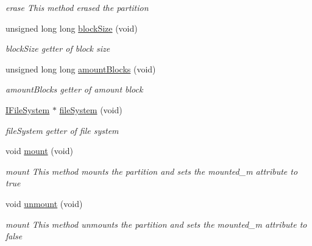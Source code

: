 \begin{DoxyCompactItemize}
\begin{DoxyCompactList}\small\item\em erase This method erased the partition \end{DoxyCompactList}\item 
unsigned long long \mbox{\hyperlink{classcore_1_1logic_1_1_partition_ad3fb03e884170c6068b6724f1121ecc6}{block\+Size}} (void)
\begin{DoxyCompactList}\small\item\em block\+Size getter of block size \end{DoxyCompactList}\item 
unsigned long long \mbox{\hyperlink{classcore_1_1logic_1_1_partition_a28f8b672dccb67a06036e223be813950}{amount\+Blocks}} (void)
\begin{DoxyCompactList}\small\item\em amount\+Blocks getter of amount block \end{DoxyCompactList}\item 
\mbox{\hyperlink{classcore_1_1_i_file_system}{I\+File\+System}} $\ast$ \mbox{\hyperlink{classcore_1_1logic_1_1_partition_a37dd86b3bc84bc1c7463beaf6d3adc57}{file\+System}} (void)
\begin{DoxyCompactList}\small\item\em file\+System getter of file system \end{DoxyCompactList}\item 
\mbox{\label{classcore_1_1logic_1_1_partition_adeee9ac61d563134c5c1157d5e8d80d5}} 
void \mbox{\hyperlink{classcore_1_1logic_1_1_partition_adeee9ac61d563134c5c1157d5e8d80d5}{mount}} (void)
\begin{DoxyCompactList}\small\item\em mount This method mounts the partition and sets the mounted\+\_\+m attribute to true \end{DoxyCompactList}\item 
\mbox{\label{classcore_1_1logic_1_1_partition_adc87e31edb60281d230acdf4bd972848}} 
void \mbox{\hyperlink{classcore_1_1logic_1_1_partition_adc87e31edb60281d230acdf4bd972848}{unmount}} (void)
\begin{DoxyCompactList}\small\item\em mount This method unmounts the partition and sets the mounted\+\_\+m attribute to false \end{DoxyCompactList}\item 

\end{DoxyCompactItemize}
